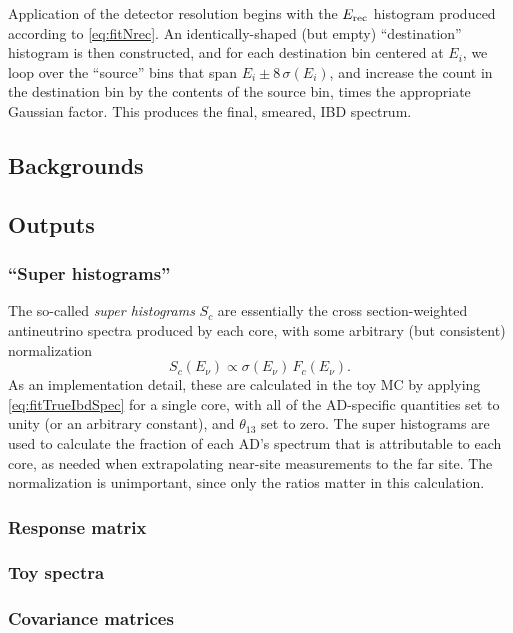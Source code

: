 \documentclass[../thesis.tex]{subfiles}
\begin{document}
Application of the detector resolution begins with the $E_\mathrm{rec}$ histogram produced according to \autoref{eq:fitNrec}. An identically-shaped (but empty) ``destination'' histogram is then constructed, and for each destination bin centered at $E_i$, we loop over the ``source'' bins that span $E_i \pm 8\,\sigma(E_i)$, and increase the count in the destination bin by the contents of the source bin, times the appropriate Gaussian factor. This produces the final, smeared, IBD spectrum.
\subsection{Backgrounds}
\label{sec:fitToyBackgrounds}

\subsection{Outputs}
\label{sec:fitToyOutputs}


\subsubsection{``Super histograms''}

The so-called \emph{super histograms} $S_c$ are essentially the cross section-weighted antineutrino spectra produced by each core, with some arbitrary (but consistent) normalization
\begin{equation*}
  S_c(E_\nu) \propto \sigma(E_\nu)\,F_c(E_\nu).
\end{equation*}
As an implementation detail, these are calculated in the toy MC by applying \autoref{eq:fitTrueIbdSpec} for a single core, with all of the AD-specific quantities set to unity (or an arbitrary constant), and $\theta_{13}$ set to zero. The super histograms are used to calculate the fraction of each AD's spectrum that is attributable to each core, as needed when extrapolating near-site measurements to the far site. The normalization is unimportant, since only the ratios matter in this calculation.
\subsubsection{Response matrix}

\subsubsection{Toy spectra}

\subsubsection{Covariance matrices}
\end{document}
